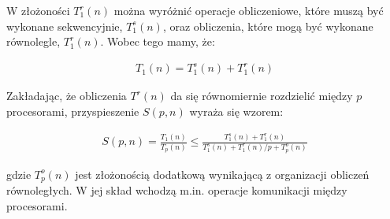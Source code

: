 W złożoności \(T^{r}_{1}(n)\) można wyróżnić operacje obliczeniowe, które muszą być wykonane sekwencyjnie, \(T^{s}_{1}(n)\), oraz obliczenia, które mogą być wykonane równolegle, \(T^{r}_{1}(n)\). Wobec tego mamy, że:

\begin{align}
T_{1}(n) = T^{s}_{1}(n) + T^{r}_{1}(n)
\end{align}

Zakładając, że obliczenia \(T^{r}(n)\) da się równomiernie rozdzielić między \(p\) procesorami, przyspieszenie \(S(p, n)\) wyraża się wzorem:

\begin{align}\label{eq:supSpn}
S(p, n) = \frac{T_{1}(n)}{T_{p}(n)}\leq\frac{T^{s}_{1}(n) + T^{r}_{1}(n)}{T^{s}_{1}(n) + T^{r}_{1}(n)/p + T^{o}_{p}(n)}
\end{align}


gdzie \(T^{o}_{p}(n)\) jest złożonością dodatkową wynikającą z organizacji obliczeń równoległych. W jej skład wchodzą m.in. operacje komunikacji między procesorami.

